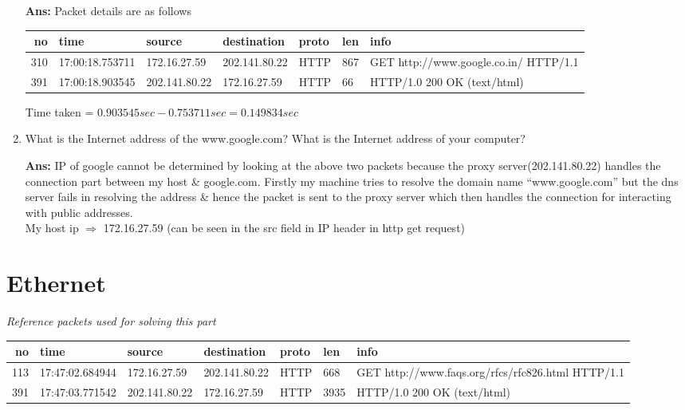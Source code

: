 \documentclass[a4,11pt]{article}
\newenvironment{que}
{ \color{YellowGreen}
  \begin{question}
}
{ \end{question} }
\newenvironment{sol}
{ \color{Black}
  \begin{solution}
}
{ \end{solution} }
\begin{document}
\begin{enumerate}
    \begin{sol}
      \textbf{Ans:} Packet details are as follows \\
      \begin{tabular}{|r|l|l|l|l|l| p{10cm} |}
       \hline
       no&	time&			source&			destination&		proto&	len&	info \\
       \hline
       310& 	17:00:18.753711& 	172.16.27.59& 		202.141.80.22& 		HTTP& 	867& 	GET http://www.google.co.in/ HTTP/1.1 \\
       391& 	17:00:18.903545&	202.141.80.22&		172.16.27.59&		HTTP&	66&	HTTP/1.0 200 OK  (text/html)\\
       \hline
      \end{tabular}

      Time taken = $0.903545sec-0.753711 sec = 0.149834 sec$
    \end{sol}
 
      \item
      \begin{que}
	What is the Internet address of the www.google.com? What is the Internet address of your computer? 
      \end{que}
      
      \begin{sol}
	\textbf{Ans:} IP of google cannot be determined by looking at the above two packets because the proxy server(202.141.80.22) handles
	the connection part between my host \& google.com. Firstly my machine tries to resolve the domain name ``www.google.com''
	but the dns server fails in resolving the address \& hence the packet is sent to the proxy server which then handles 
	the connection for interacting with public addresses.\\
	My host ip $\Rightarrow$ 172.16.27.59 (can be seen in the src field in IP header in http get request)
      \end{sol}
\end{enumerate}
\pagebreak 


\section{Ethernet}
	 
    \textit{Reference packets used for solving this part}\\
      \begin{tabular}{|r|l|l|l|l|l| p{6cm} |}
       \hline
       no&	time&			source&			destination&		proto&	len&	info \\
       \hline
       113& 	17:47:02.684944& 	172.16.27.59& 		202.141.80.22& 		HTTP& 	668& 	GET http://www.faqs.org/rfcs/rfc826.html HTTP/1.1 \\
       391& 	17:47:03.771542&	202.141.80.22&		172.16.27.59&		HTTP&	3935&	HTTP/1.0 200 OK  (text/html)\\
       \hline
      \end{tabular}
	  
\end{document}
